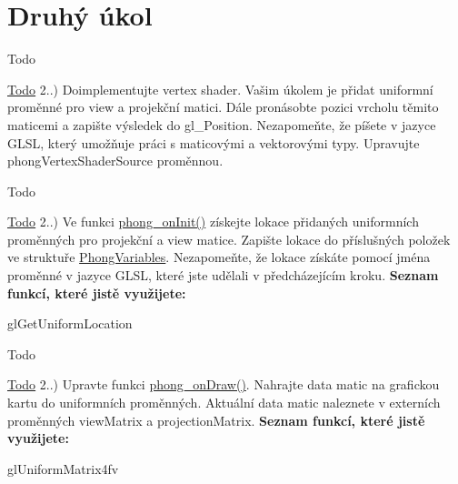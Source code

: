 \hypertarget{group__task2}{}\section{Druhý úkol}
\label{group__task2}
\begin{DoxyRefDesc}{Todo}
\item[\hyperlink{todo__todo000001}{Todo}]2..) Doimplementujte vertex shader. Vašim úkolem je přidat uniformní proměnné pro view a projekční matici. Dále pronásobte pozici vrcholu těmito maticemi a zapište výsledek do gl\+\_\+\+Position. Nezapomeňte, že píšete v jazyce G\+L\+S\+L, který umožňuje práci s maticovými a vektorovými typy. Upravujte phong\+Vertex\+Shader\+Source proměnnou. \end{DoxyRefDesc}
\begin{DoxyRefDesc}{Todo}
\item[\hyperlink{todo__todo000005}{Todo}]2..) Ve funkci \hyperlink{student_8h_ac2adb2ba4e748239b9db4d037584d3cc}{phong\+\_\+on\+Init()} získejte lokace přidaných uniformních proměnných pro projekční a view matice. Zapište lokace do příslušných položek ve struktuře \hyperlink{structPhongVariables}{Phong\+Variables}. Nezapomeňte, že lokace získáte pomocí jména proměnné v jazyce G\+L\+S\+L, které jste udělali v předcházejícím kroku. {\bfseries Seznam funkcí, které jistě využijete\+:}
\begin{DoxyItemize}
\item gl\+Get\+Uniform\+Location 
\end{DoxyItemize}\end{DoxyRefDesc}


\begin{DoxyRefDesc}{Todo}
\item[\hyperlink{todo__todo000009}{Todo}]2..) Upravte funkci \hyperlink{student_8h_a53ffbb1a271d285abdaf7a029192f47e}{phong\+\_\+on\+Draw()}. Nahrajte data matic na grafickou kartu do uniformních proměnných. Aktuální data matic naleznete v externích proměnných view\+Matrix a projection\+Matrix. {\bfseries Seznam funkcí, které jistě využijete\+:}
\begin{DoxyItemize}
\item gl\+Uniform\+Matrix4fv 
\end{DoxyItemize}\end{DoxyRefDesc}
